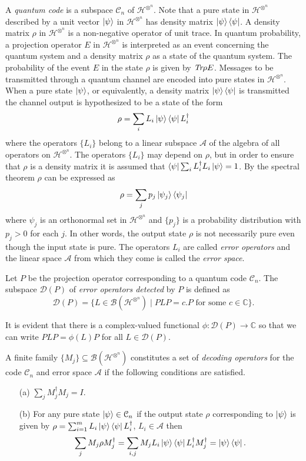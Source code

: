 \documentclass{Rinton-P9x6}
\newcommand {\ket} [1] {\ensuremath \left\vert#1\ensuremath \right\rangle}
\newcommand {\bra} [1] {\ensuremath \left\langle#1\ensuremath \right\vert}
\newcommand{\Tr}{\mbox{\it Tr}}
\newcommand{\Hi}{{\ensuremath{\mathcal{H}}}}
\newcommand{\A}{{\ensuremath{\mathcal{A}}}}
\newcommand{\B}{{\ensuremath{\mathcal{B}}}}
\newcommand{\C}{{\ensuremath{\mathcal{C}}}}
\newcommand{\complex}{{\ensuremath{\mathbb{C}}}}
\newcommand{\Hin}{{\ensuremath{\mathcal{H}^{\otimes^n}}}}
\newcommand{\D}{{\ensuremath{\mathcal{D}}}}
\begin{document}
A \emph{quantum code} is a subspace $\C_n$ of $\Hi^{\otimes^n}$. Note
that a pure state in $\Hi^{\otimes^n}$ described by a unit vector
$\ket{\psi}$ in $\Hi^{\otimes^n}$ has density matrix
$\ket{\psi}\bra{\psi}$. A density matrix $\rho$ in $\Hi^{\otimes^n}$
is a non-negative operator of unit trace. In quantum probability, a
projection operator $E$ in $\Hi^{\otimes^n}$ is interpreted as an
event concerning the quantum system and a density matrix $\rho$ as a
state of the quantum system. The probability of the event $E$ in the
state $\rho$ is given by $\Tr\rho E$. Messages to be transmitted
through a quantum channel are encoded into pure states in
$\Hi^{\otimes^n}$. When a pure state $\ket{\psi}$, or equivalently, a
density matrix $\ket{\psi}\bra{\psi}$ is transmitted the channel
output is hypothesized to be a state of the form
\begin{eqnarray}
\rho=\sum_{i}L_i\ket{\psi}\bra{\psi}L_i^{\dagger}\label{eq-1}
\end{eqnarray}
where the operators $\{L_i\}$ belong to a linear subspace $\A$ of the
algebra of all operators on $\Hi^{\otimes^n}$. The operators $\{L_i\}$
may depend on $\rho$, but in order to ensure that $\rho$ is a density
matrix it is assumed that $\bra{\psi}\sum_i
L^{\dagger}_iL_i\ket{\psi}=1$. By the spectral theorem $\rho$ can
be expressed as
\[
\rho = \sum_{j}p_j\ket{\psi_j}\bra{\psi_j}
\]
where $\psi_j$ is an orthonormal set in $\Hi^{\otimes^n}$ and
$\{p_j\}$ is a probability distribution with $p_j>0$ for each $j$.  In
other words, the output state $\rho$ is not necessarily pure even
though the input state is pure.  The operators $L_i$ are called
\emph{error operators} and the linear space $\A$ {from} which they
come is called the \emph{error space}.

Let $P$ be the projection operator corresponding to a quantum code
$\C_n$. The subspace $\D(P)$ of \emph{error operators detected} by $P$
is defined as
\[
\D(P)=\{L\in\B(\Hin)\mid PLP=c.P\mbox{ for some }c\in\complex\}.
\]

It is evident that there is a complex-valued functional
$\phi:\D(P)\rightarrow\complex$ so that we can write $PLP=\phi(L)P$
for all $L\in\D(P)$.

A finite family $\{M_j\}\subseteq\B(\Hin)$ constitutes a set
of \emph{decoding operators} for the code $\C_n$ and error space $\A$
if the following conditions are satisfied.
\begin{itemize}
\item[(a)] $\sum_j M^{\dagger}_jM_j=I$.
\item[(b)] For any pure state $\ket{\psi} \in \C_n$ if the output state
  $\rho$ corresponding to $\ket{\psi}$ is given by 
$\rho = \sum_{i=1}^m L_i\ket{\psi}\bra{\psi}L_i^\dagger$, $L_i \in \A$ then 
  \[
  \sum_j M_j\rho M^{\dagger}_j=
  \sum_{i,j}M_jL_i\ket{\psi}\bra{\psi}L_i^{\dagger}M_j^{\dagger}
  =\ket{\psi}\bra{\psi}.
  \]
\end{itemize}
\end{document}
